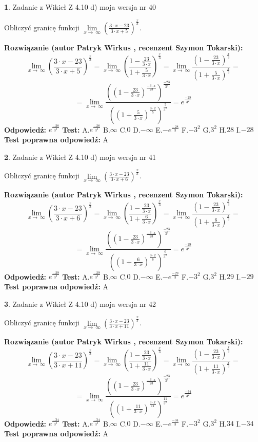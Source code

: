 \documentclass[12pt, a4paper]{article}
\theoremstyle{definition} %
\newtheorem{zad}{}
\newcommand{\zadStart}[1]{\begin{zad}#1\newline}
\newcommand{\zadStop}{\end{zad}}
\newcommand{\rozwStart}[2]{\noindent \textbf{Rozwiązanie (autor #1 , recenzent #2): }\newline}
\newcommand{\rozwStop}{\newline}
\newcommand{\odpStart}{\noindent \textbf{Odpowiedź:}\newline}
\newcommand{\odpStop}{\newline}
\newcommand{\testStart}{\noindent \textbf{Test:}\newline}
\newcommand{\testStop}{\newline}
\newcommand{\kluczStart}{\noindent \textbf{Test poprawna odpowiedź:}\newline}
\newcommand{\kluczStop}{\newline}
\begin{document}
\zadStart{Zadanie z Wikieł Z 4.10 d) moja wersja nr 40}


Obliczyć granicę funkcji  $\lim\limits_{x\to\ \infty}(\frac{3\cdot x-23}{3\cdot x+5})^{\frac{x}{3}}$.
\zadStop
\rozwStart{Patryk Wirkus}{Szymon Tokarski}
$$\lim\limits_{x\to\ \infty}(\frac{3\cdot x-23}{3\cdot x+5})^{\frac{x}{3}} = \lim\limits_{x\to\ \infty}(\frac{1-\frac{23}{3\cdot x}}{1+\frac{5}{3\cdot x}})^{\frac{x}{3}}=\lim\limits_{x\to\ \infty}\frac{(1-\frac{23}{3\cdot x})^{\frac{x}{3}}}{(1+\frac{5}{3\cdot x})^{\frac{x}{3}}}=$$
$$=\lim\limits_{x\to\ \infty}\frac{((1-\frac{23}{3\cdot x})^{\frac{-3\cdot x}{23}})^{\frac{-23}{3^{2}}}}{((1+\frac{5}{3\cdot x})^{\frac{3\cdot x}{5}})^{\frac{5}{3^{2}}}}=e^{\frac{-28}{3^{2}}}$$
\rozwStop
\odpStart
$e^{\frac{-28}{3^{2}}}$
\odpStop
\testStart
A.$e^{\frac{-28}{3^{2}}}$ B.$\infty$ C.$0$ D.$-\infty$ E.$-e^{\frac{-28}{3}}$
F.$-3^{2}$ G.$3^{2}$
H.$28$
I.$-28$
\testStop
\kluczStart
A
\kluczStop



\zadStart{Zadanie z Wikieł Z 4.10 d) moja wersja nr 41}


Obliczyć granicę funkcji  $\lim\limits_{x\to\ \infty}(\frac{3\cdot x-23}{3\cdot x+6})^{\frac{x}{3}}$.
\zadStop
\rozwStart{Patryk Wirkus}{Szymon Tokarski}
$$\lim\limits_{x\to\ \infty}(\frac{3\cdot x-23}{3\cdot x+6})^{\frac{x}{3}} = \lim\limits_{x\to\ \infty}(\frac{1-\frac{23}{3\cdot x}}{1+\frac{6}{3\cdot x}})^{\frac{x}{3}}=\lim\limits_{x\to\ \infty}\frac{(1-\frac{23}{3\cdot x})^{\frac{x}{3}}}{(1+\frac{6}{3\cdot x})^{\frac{x}{3}}}=$$
$$=\lim\limits_{x\to\ \infty}\frac{((1-\frac{23}{3\cdot x})^{\frac{-3\cdot x}{23}})^{\frac{-23}{3^{2}}}}{((1+\frac{6}{3\cdot x})^{\frac{3\cdot x}{6}})^{\frac{6}{3^{2}}}}=e^{\frac{-29}{3^{2}}}$$
\rozwStop
\odpStart
$e^{\frac{-29}{3^{2}}}$
\odpStop
\testStart
A.$e^{\frac{-29}{3^{2}}}$ B.$\infty$ C.$0$ D.$-\infty$ E.$-e^{\frac{-29}{3}}$
F.$-3^{2}$ G.$3^{2}$
H.$29$
I.$-29$
\testStop
\kluczStart
A
\kluczStop



\zadStart{Zadanie z Wikieł Z 4.10 d) moja wersja nr 42}


Obliczyć granicę funkcji  $\lim\limits_{x\to\ \infty}(\frac{3\cdot x-23}{3\cdot x+11})^{\frac{x}{3}}$.
\zadStop
\rozwStart{Patryk Wirkus}{Szymon Tokarski}
$$\lim\limits_{x\to\ \infty}(\frac{3\cdot x-23}{3\cdot x+11})^{\frac{x}{3}} = \lim\limits_{x\to\ \infty}(\frac{1-\frac{23}{3\cdot x}}{1+\frac{11}{3\cdot x}})^{\frac{x}{3}}=\lim\limits_{x\to\ \infty}\frac{(1-\frac{23}{3\cdot x})^{\frac{x}{3}}}{(1+\frac{11}{3\cdot x})^{\frac{x}{3}}}=$$
$$=\lim\limits_{x\to\ \infty}\frac{((1-\frac{23}{3\cdot x})^{\frac{-3\cdot x}{23}})^{\frac{-23}{3^{2}}}}{((1+\frac{11}{3\cdot x})^{\frac{3\cdot x}{11}})^{\frac{11}{3^{2}}}}=e^{\frac{-34}{3^{2}}}$$
\rozwStop
\odpStart
$e^{\frac{-34}{3^{2}}}$
\odpStop
\testStart
A.$e^{\frac{-34}{3^{2}}}$ B.$\infty$ C.$0$ D.$-\infty$ E.$-e^{\frac{-34}{3}}$
F.$-3^{2}$ G.$3^{2}$
H.$34$
I.$-34$
\testStop
\kluczStart
A
\kluczStop
\end{document}
